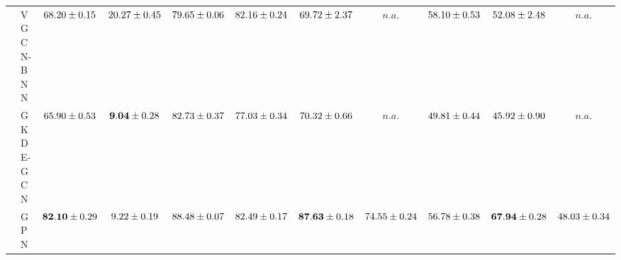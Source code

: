 \begin{table*}[!h]
{\begin{tabular}{ll|cc|cccc|ccc}
        & VGCN-BNN & ${68.20\tiny \pm 0.15}$ & ${20.27\tiny \pm 0.45}$ & ${79.65\tiny \pm 0.06}$ & ${82.16\tiny \pm 0.24}$ & ${69.72\tiny \pm 2.37}$ & $n.a.$ & ${58.10\tiny \pm 0.53}$ & ${52.08\tiny \pm 2.48}$ & $n.a.$\\
        & GKDE-GCN & ${65.90\tiny \pm 0.53}$ & ${\mathbf{9.04}\tiny \pm 0.28}$ & ${82.73\tiny \pm 0.37}$ & ${77.03\tiny \pm 0.34}$ & ${70.32\tiny \pm 0.66}$ & $n.a.$ & ${49.81\tiny \pm 0.44}$ & ${45.92\tiny \pm 0.90}$ & $n.a.$\\
        & GPN & ${\mathbf{82.10}\tiny \pm 0.29}$ & ${9.22\tiny \pm 0.19}$ & ${88.48\tiny \pm 0.07}$ & ${82.49\tiny \pm 0.17}$ & ${\mathbf{87.63}\tiny \pm 0.18}$ & ${{74.55}\tiny \pm 0.24}$ & ${56.78\tiny \pm 0.38}$ & ${\mathbf{67.94}\tiny \pm 0.28}$ & ${{48.03}\tiny \pm 0.34}$\\


        \midrule
        

\end{tabular}}
\end{table*}
